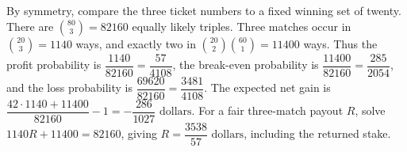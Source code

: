 By symmetry, compare the three ticket numbers to a fixed winning set of twenty. There are $\binom{80}{3}=82160$ equally likely triples. Three matches occur in $\binom{20}{3}=1140$ ways, and exactly two in $\binom{20}{2}\binom{60}{1}=11400$ ways. Thus the profit probability is $\dfrac{1140}{82160}=\dfrac{57}{4108}$, the break-even probability is $\dfrac{11400}{82160}=\dfrac{285}{2054}$, and the loss probability is $\dfrac{69620}{82160}=\dfrac{3481}{4108}$. The expected net gain is $\dfrac{42\cdot1140+11400}{82160}-1=\boxed{-\dfrac{286}{1027}\text{ dollars}}$. For a fair three-match payout $R$, solve $1140R+11400=82160$, giving $\boxed{R=\dfrac{3538}{57}\text{ dollars}}$, including the returned stake.
